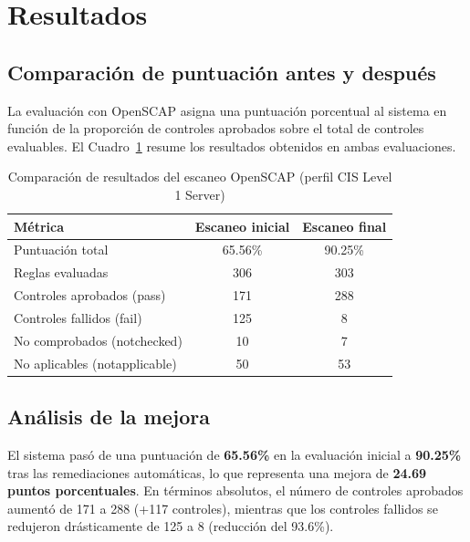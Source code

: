 \documentclass[12pt,letterpaper]{article}
\begin{document}
\section{Resultados}

\subsection{Comparación de puntuación antes y después}

La evaluación con OpenSCAP asigna una puntuación porcentual al sistema en función de la proporción de controles aprobados sobre el total de controles evaluables. El Cuadro~\ref{tab:resultados} resume los resultados obtenidos en ambas evaluaciones.

\begin{table}[H]
\centering
\caption{Comparación de resultados del escaneo OpenSCAP (perfil CIS Level 1 Server)}
\label{tab:resultados}
\begin{tabular}{lcc}
\toprule
\textbf{Métrica} & \textbf{Escaneo inicial} & \textbf{Escaneo final} \\
\midrule
Puntuación total      & 65.56\%  & 90.25\%  \\
Reglas evaluadas      & 306      & 303      \\
Controles aprobados (pass)   & 171      & 288      \\
Controles fallidos (fail)    & 125      & 8        \\
No comprobados (notchecked)  & 10       & 7        \\
No aplicables (notapplicable)& 50       & 53       \\
\bottomrule
\end{tabular}
\end{table}

\subsection{Análisis de la mejora}

El sistema pasó de una puntuación de \textbf{65.56\%} en la evaluación inicial a \textbf{90.25\%} tras las remediaciones automáticas, lo que representa una mejora de \textbf{24.69 puntos porcentuales}. En términos absolutos, el número de controles aprobados aumentó de 171 a 288 (+117 controles), mientras que los controles fallidos se redujeron drásticamente de 125 a 8 (reducción del 93.6\%).
\end{document}
